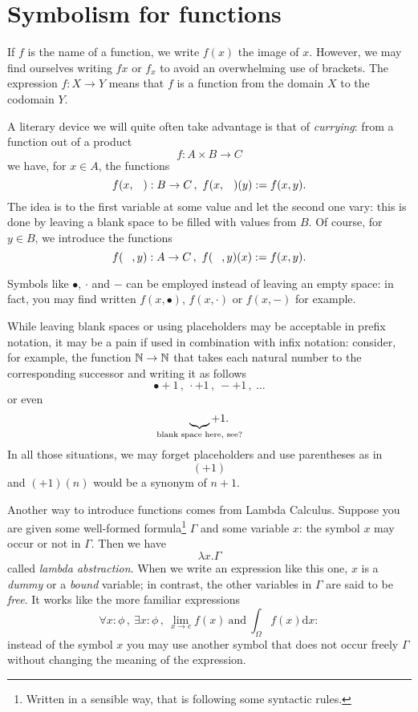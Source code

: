 
\section{Symbolism for functions}

If \(f\) is the name of a function, we write \(f(x)\) the image of \(x\). However, we may find ourselves writing \(fx\) or \(f_x\) to avoid an overwhelming use of brackets. The expression \(f : X \to Y\) means that \(f\) is a function from the domain \(X\) to the codomain \(Y\).

A literary device we will quite often take advantage is that of {\em currying}: from a function out of a product
\[f : A \times B \to C\]
we have, for \(x \in A\), the functions
\[f(x, \hole) : B \to C\,, \ f(x,\hole) (y) := f(x, y) .\]
The idea is to  the first variable at some value and let the second one vary: this is done by leaving a blank space to be filled with values from \(B\). Of course, for \(y \in B\), we introduce the functions
\[f(\hole, y) : A \to C\,, \ f(\hole,y) (x) := f(x, y) .\]

Symbols like \(\bullet\), \(\cdot\) and \(-\) can be employed instead of leaving an empty space: in fact, you may find written \(f(x, \bullet)\), \(f(x, \cdot)\) or \(f(x, -)\) for example.

While leaving blank spaces or using placeholders may be acceptable in prefix notation, it may be a pain if used in combination with infix notation: consider, for example, the function \(\mathbb N \to \mathbb N\) that takes each natural number to the corresponding successor and writing it as follows
\[\bullet + 1 \,,\ \cdot + 1 \,,\ - + 1 \,,\ \dots{}\]
or even
\[\underbrace{\hole}_{\mathclap{\text{blank space here, see?}}} + 1 .\]
In all those situations, we may forget placeholders and use parentheses as in
\[(+1)\]
and \((+1)(n)\) would be a synonym of \(n+1\).

Another way to introduce functions comes from Lambda Calculus. Suppose you are given some well-formed formula\footnote{Written in a sensible way, that is following some syntactic rules. } \(\Gamma\) and some variable \(x\): the symbol \(x\) may occur or not in \(\Gamma\). Then we have
\[\lambda x . \Gamma\]
called {\em lambda abstraction}. When we write an expression like this one, \(x\) is a {\em dummy} or a {\em bound} variable; in contrast, the other variables in \(\Gamma\) are said to be {\em free}. It works like the more familiar expressions
\[\forall x : \phi\,,\ \exists x : \phi\,,\ \displaystyle \lim_{x \to c} f(x)\ \text{and} \ \displaystyle \int_\Omega f(x) \mathrm d x :\]
instead of the symbol \(x\) you may use another symbol that does not occur freely \(\Gamma\) without changing the meaning of the expression.

